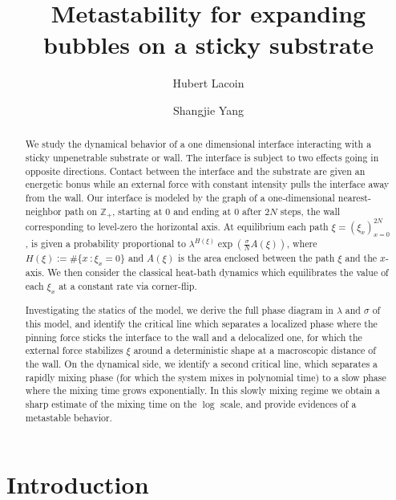 \documentclass[reqno,11pt]{amsart}
\title[Metastability for expanding bubbles on a sticky substrate]{Metastability for expanding bubbles on a sticky substrate}
\author[Hubert Lacoin]{Hubert Lacoin}
\author[Shangjie Yang]{Shangjie Yang}
\numberwithin{equation}{section}
\newcommand{\gl}{\lambda}
\begin{document}
\setcounter{tocdepth}{1}


\begin{abstract}
We study the dynamical behavior of a one dimensional interface interacting with a sticky unpenetrable substrate or wall. The interface is subject to two effects going in opposite directions.
Contact between the interface and the substrate are given an energetic bonus while an external force with constant intensity pulls the interface away from the wall. 
Our interface is modeled by the graph of a  one-dimensional nearest-neighbor path on $\mathbb{Z}_+$, starting at $0$ and ending at $0$ after $2N$ steps, the wall corresponding to level-zero the horizontal axis.
At equilibrium
each path $\xi=(\xi_x)_{x=0}^{2N}$, is given a probability proportional to $\lambda^{H(\xi)} \exp(\frac{\sigma}{N}A(\xi))$, 
 where $H(\xi):=\#\{x \ : \xi_x=0\}$ and $A(\xi)$ is the area enclosed between the path $\xi$ and the $x$-axis. We then consider the classical heat-bath dynamics which equilibrates the value of each $\xi_x$ at a constant rate via corner-flip. 
 

Investigating the statics of the model, we derive the full phase diagram in $\gl$ and $\sigma$ of this model, and identify the critical line which separates a localized phase where the pinning force sticks the interface to the wall and a delocalized one, for which the external force stabilizes $\xi$ around a deterministic shape at a macroscopic distance of the wall.
On the dynamical side, we identify a second critical line, which separates a rapidly mixing phase (for which the system mixes in polynomial time) to a slow phase where the mixing time grows exponentially. In this slowly mixing regime we obtain a sharp estimate of the mixing time on the $\log$ scale, and provide evidences of a metastable behavior.
\end{abstract}

\maketitle

\tableofcontents


\section{Introduction}\label{sec:intro}
\end{document}
